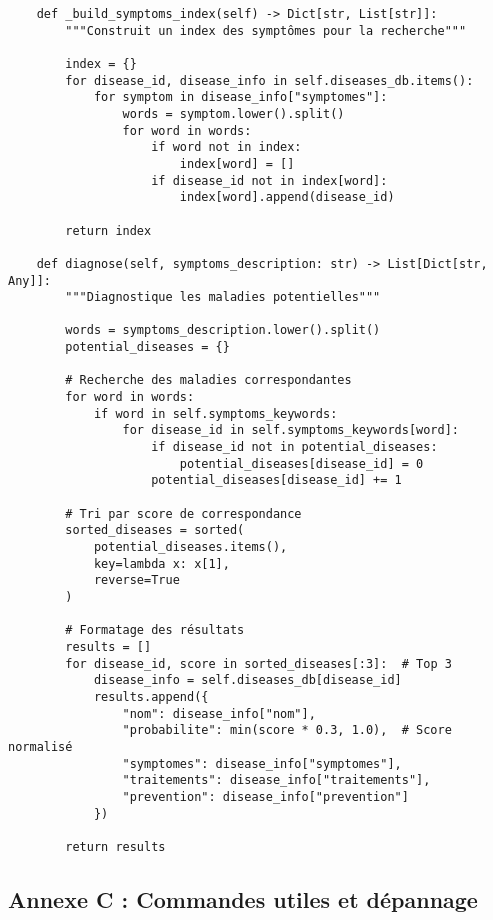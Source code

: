 \begin{verbatim}
    def _build_symptoms_index(self) -> Dict[str, List[str]]:
        """Construit un index des symptômes pour la recherche"""

        index = {}
        for disease_id, disease_info in self.diseases_db.items():
            for symptom in disease_info["symptomes"]:
                words = symptom.lower().split()
                for word in words:
                    if word not in index:
                        index[word] = []
                    if disease_id not in index[word]:
                        index[word].append(disease_id)

        return index

    def diagnose(self, symptoms_description: str) -> List[Dict[str, Any]]:
        """Diagnostique les maladies potentielles"""

        words = symptoms_description.lower().split()
        potential_diseases = {}

        # Recherche des maladies correspondantes
        for word in words:
            if word in self.symptoms_keywords:
                for disease_id in self.symptoms_keywords[word]:
                    if disease_id not in potential_diseases:
                        potential_diseases[disease_id] = 0
                    potential_diseases[disease_id] += 1

        # Tri par score de correspondance
        sorted_diseases = sorted(
            potential_diseases.items(),
            key=lambda x: x[1],
            reverse=True
        )

        # Formatage des résultats
        results = []
        for disease_id, score in sorted_diseases[:3]:  # Top 3
            disease_info = self.diseases_db[disease_id]
            results.append({
                "nom": disease_info["nom"],
                "probabilite": min(score * 0.3, 1.0),  # Score normalisé
                "symptomes": disease_info["symptomes"],
                "traitements": disease_info["traitements"],
                "prevention": disease_info["prevention"]
            })

        return results
\end{verbatim}

\subsection{Annexe C : Commandes utiles et dépannage}

